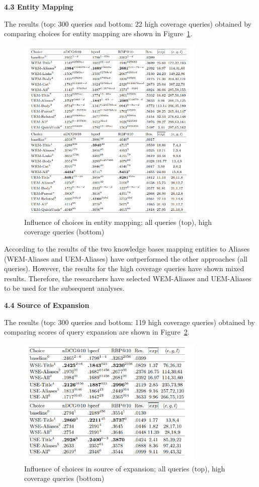 \documentclass[]{article}
\begin{document}
\textbf{4.3 Entity Mapping}   

The results (top: 300 queries and bottom: 22 high coverage queries) obtained by comparing choices for entity mapping are shown in Figure~\ref{fig30}.  

\begin{figure}[t!]
	\includegraphics[width=0.8\textwidth]{Capture30.png}
	\caption{Influence of choices in entity mapping; all queries (top), high coverage queries (bottom) \label{fig30}}
\end{figure} 

According to the results of the two knowledge bases mapping entities to Aliases (WEM-Aliases and UEM-Aliases) have outperformed the other approaches (all queries). However, the results for the high coverage queries have shown mixed results. Therefore, the researchers have selected WEM-Aliases and UEM-Aliases to be used for the subsequent analyses.

\textbf{4.4 Source of Expansion} 

The results (top: 300 queries and bottom: 119 high coverage queries) obtained by comparing scores of query expansion are shown in Figure~\ref{fig31}. 

\begin{figure}[b!]
	\includegraphics[width=0.8\textwidth]{Capture31.png}
	\caption{Influence of choices in source of expansion; all queries (top), high coverage queries (bottom) \label{fig31}}
\end{figure} 
\end{document}
